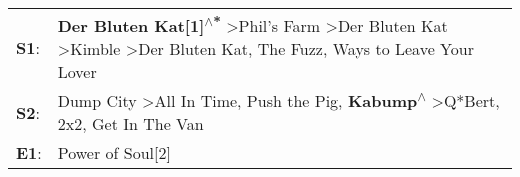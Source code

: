 \begin{supertabular}{p{0.03\textwidth}p{0.92\textwidth}}
 \textbf{S1}:  &  \textbf{Der Bluten Kat[1]\textsuperscript{$\wedge$*}} \textgreater \enspace Phil's Farm\textsuperscript{} \textgreater \enspace Der Bluten Kat\textsuperscript{} \textgreater \enspace Kimble\textsuperscript{} \textgreater \enspace Der Bluten Kat\textsuperscript{}, \enspace The Fuzz\textsuperscript{},  Ways to Leave Your Lover\textsuperscript{}  \enspace  \\
 \textbf{S2}:  &                                                               Dump City\textsuperscript{} \textgreater \enspace All In Time\textsuperscript{}, \enspace Push the Pig\textsuperscript{}, \enspace \textbf{Kabump\textsuperscript{$\wedge$}} \textgreater \enspace Q*Bert\textsuperscript{}, \enspace 2x2\textsuperscript{}, \enspace Get In The Van\textsuperscript{}  \enspace  \\
 \textbf{E1}:  &                                                                                                                                                                                                                                                                                                                                   Power of Soul[2]\textsuperscript{}  \enspace  \\
\end{supertabular}
